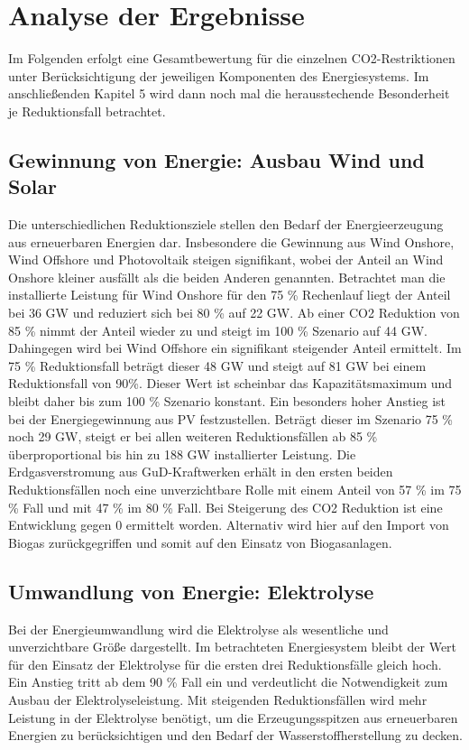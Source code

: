 \section{Analyse der Ergebnisse}
Im Folgenden erfolgt eine Gesamtbewertung für die einzelnen CO2-Restriktionen unter Berücksichtigung der jeweiligen Komponenten des Energiesystems. Im anschließenden Kapitel 5 wird dann noch mal die herausstechende Besonderheit je Reduktionsfall betrachtet. 

\subsection{Gewinnung von Energie: Ausbau Wind und Solar}
Die unterschiedlichen Reduktionsziele stellen den Bedarf der Energieerzeugung aus erneuerbaren Energien dar. Insbesondere die Gewinnung aus Wind Onshore, Wind Offshore und Photovoltaik steigen signifikant, wobei der Anteil an Wind Onshore kleiner ausfällt als die beiden Anderen genannten. 
\newline
Betrachtet man die installierte Leistung für Wind Onshore für den 75 \% Rechenlauf liegt der Anteil bei 36 GW und reduziert sich bei 80 \% auf 22 GW. Ab einer CO2 Reduktion von 85 \% nimmt der Anteil wieder zu und steigt im 100 \% Szenario auf 44 GW. 
Dahingegen wird bei Wind Offshore ein signifikant steigender Anteil ermittelt. Im 75 \% Reduktionsfall beträgt dieser 48 GW und steigt auf 81 GW bei einem Reduktionsfall von 90\%. Dieser Wert ist scheinbar das Kapazitätsmaximum und bleibt daher bis zum 100 \% Szenario konstant.
\newline
Ein besonders hoher Anstieg ist bei der Energiegewinnung aus PV festzustellen. Beträgt dieser im Szenario 75 \% noch 29 GW, steigt er bei allen weiteren Reduktionsfällen ab 85 \% überproportional bis hin zu 188 GW installierter Leistung.
\newline
Die Erdgasverstromung aus GuD-Kraftwerken erhält in den ersten beiden Reduktionsfällen noch eine unverzichtbare Rolle mit einem Anteil von 57 \% im 75 \% Fall und mit 47 \% im 80 \% Fall. Bei Steigerung des CO2 Reduktion ist eine Entwicklung gegen 0 ermittelt worden. Alternativ wird hier auf den Import von Biogas zurückgegriffen und somit auf den Einsatz von Biogasanlagen.


\subsection{Umwandlung von Energie: Elektrolyse}
Bei der Energieumwandlung wird die Elektrolyse als wesentliche und unverzichtbare Größe dargestellt. Im betrachteten Energiesystem bleibt der Wert für den Einsatz der Elektrolyse für die ersten drei Reduktionsfälle gleich hoch. Ein Anstieg tritt ab dem 90 \% Fall ein und verdeutlicht die Notwendigkeit zum Ausbau der Elektrolyseleistung. Mit steigenden Reduktionsfällen wird mehr Leistung in der Elektrolyse benötigt, um die Erzeugungsspitzen aus erneuerbaren Energien zu berücksichtigen und den Bedarf der Wasserstoffherstellung zu decken.  


